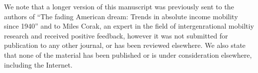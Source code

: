 \documentclass[12pt,letter,sans]{moderncv} %
\begin{document}
We note that a longer version of this manuscript was previously sent to the authors of ``The fading American dream: Trends in absolute income mobility since 1940'' and to Miles Corak, an expert in the field of intergenrational mobiltiy research and received positive feedback, however it was not submitted for publication to any other journal, or has been reviewed elsewhere. We also state that none of the material has been published or is under consideration elsewhere, including the Internet.

\makeletterclosing
\end{document}
